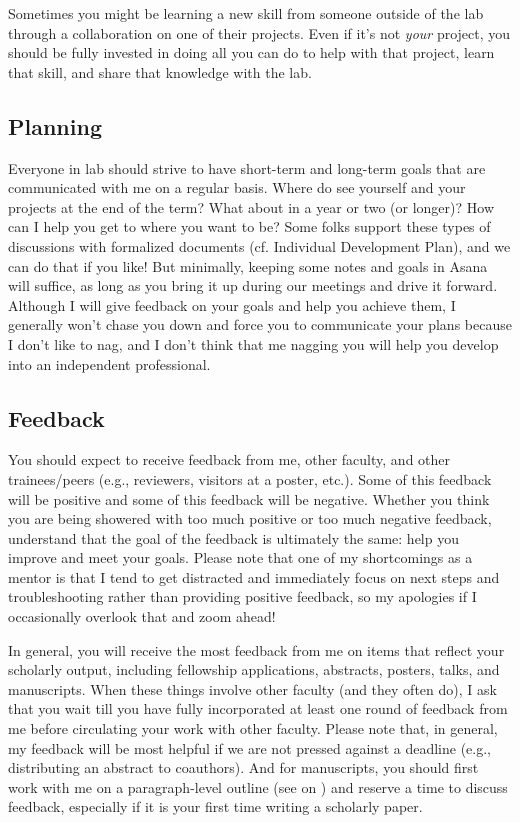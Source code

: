 \documentclass[letterpaper,11pt,oneside]{memoir}
\begin{document}
Sometimes you might be learning a new skill from someone outside of the lab through a collaboration on one of their projects. Even if it's not \textit{your} project, you should be fully invested in doing all you can do to help with that project, learn that skill, and share that knowledge with the lab. 

\subsection{Planning}
Everyone in lab should strive to have short-term and long-term goals that are communicated with me on a regular basis. Where do see yourself and your projects at the end of the term? What about in a year or two (or longer)? How can I help you get to where you want to be? Some folks support these types of discussions with formalized documents (cf. Individual Development Plan), and we can do that if you like! But minimally, keeping some notes and goals in Asana will suffice, as long as you bring it up during our meetings and drive it forward. Although I will give feedback on your goals and help you achieve them, I generally won't chase you down and force you to communicate your plans because I don't like to nag, and I don't think that me nagging you will help you develop into an independent professional. 

\subsection{Feedback}
You should expect to receive feedback from me, other faculty, and other trainees/peers (e.g., reviewers, visitors at a poster, etc.). Some of this feedback will be positive and some of this feedback will be negative. Whether you think you are being showered with too much positive or too much negative feedback, understand that the goal of the feedback is ultimately the same: help you improve and meet your goals. Please note that one of my shortcomings as a mentor is that I tend to get distracted and immediately focus on next steps and troubleshooting rather than providing positive feedback, so my apologies if I occasionally overlook that and zoom ahead!

In general, you will receive the most feedback from me on items that reflect your scholarly output, including fellowship applications, abstracts, posters, talks, and manuscripts. When these things involve other faculty (and they often do), I ask that you wait till you have fully incorporated at least one round of feedback from me before circulating your work with other faculty. Please note that, in general, my feedback will be most helpful if we are not pressed against a deadline (e.g., distributing an abstract to coauthors). And for manuscripts, you should first work with me on a paragraph-level outline (see  on ) and reserve a time to discuss feedback, especially if it is your first time writing a scholarly paper.
\end{document}
